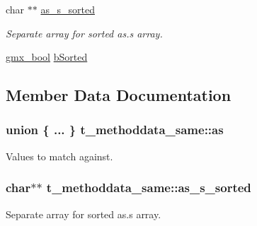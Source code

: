 \begin{DoxyCompactItemize}
\begin{tabbing}
\end{tabbing}\item 
char $\ast$$\ast$ \hyperlink{structt__methoddata__same_a8e60d150d29d86b285a3e90c249f6b8e}{as\-\_\-s\-\_\-sorted}
\begin{DoxyCompactList}\small\item\em \-Separate array for sorted {\ttfamily as.\-s} array. \end{DoxyCompactList}\item 
\hyperlink{include_2types_2simple_8h_a8fddad319f226e856400d190198d5151}{gmx\-\_\-bool} \hyperlink{structt__methoddata__same_ab2deef5320393a530545e20eb358292f}{b\-Sorted}
\end{DoxyCompactItemize}


\subsection{\-Member \-Data \-Documentation}
\hypertarget{structt__methoddata__same_ad7602caa2309a42cb04e02acb68f3075}{
\subsubsection[{as}]{\setlength{\rightskip}{0pt plus 5cm}union \{ ... \}                          {\bf t\-\_\-methoddata\-\_\-same\-::as}}}\label{structt__methoddata__same_ad7602caa2309a42cb04e02acb68f3075}
\-Values to match against. \hypertarget{structt__methoddata__same_a8e60d150d29d86b285a3e90c249f6b8e}{
\subsubsection[{as\-\_\-s\-\_\-sorted}]{\setlength{\rightskip}{0pt plus 5cm}char$\ast$$\ast$ {\bf t\-\_\-methoddata\-\_\-same\-::as\-\_\-s\-\_\-sorted}}}\label{structt__methoddata__same_a8e60d150d29d86b285a3e90c249f6b8e}


\-Separate array for sorted {\ttfamily as.\-s} array. 

